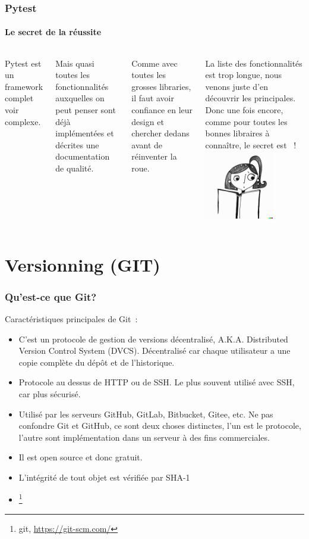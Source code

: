 \documentclass{beamer}
\begin{document}
    \begin{frame}
        \frametitle{Pytest}
        \framesubtitle{Le secret de la réussite}
        \transdissolve
        \begin{columns}
            Pytest est un framework complet voir complexe.

            Mais quasi toutes les fonctionnalités auxquelles on peut penser sont déjà implémentées et décrites une documentation de qualité.

            Comme avec toutes les grosses libraries, il faut avoir confiance en leur design et chercher dedans avant de réinventer la roue.

            La liste des fonctionnalités est trop longue, nous venons juste d'en découvrir les principales.
            \bigbreak
            Donc une fois encore, comme pour toutes les bonnes libraires à connaître, le secret est ~!
            \centering
            \includegraphics[width=3cm]{image/girl-rtfm.png}
        \end{columns}
    \end{frame}


    \section{Versionning (GIT)}\label{sec:versionning-(git)}

    \begin{frame}
        \frametitle{Qu'est-ce que Git?}
        \transdissolve
        Caractéristiques principales de Git~:
        \begin{itemize}
            \item C'est un protocole de gestion de versions décentralisé, A.K.A. Distributed Version Control System (DVCS).
            Décentralisé car chaque utilisateur a une copie complète du dépôt et de l'historique.
            \item Protocole au dessus de HTTP ou de SSH. Le plus souvent utilisé avec SSH, car plus sécurisé.
            \item Utilisé par les serveurs GitHub, GitLab, Bitbucket, Gitee, etc.
            Ne pas confondre Git et GitHub, ce sont deux choses distinctes, l'un est le protocole, l'autre sont implémentation dans un serveur à des fins commerciales.
            \item Il est open source et donc gratuit.
            \item L'intégrité de tout objet est vérifiée par SHA-1
            \item {}\footnote{git, \url{https://git-scm.com/}} 
        \end{itemize}
    \end{frame}
\end{document}
